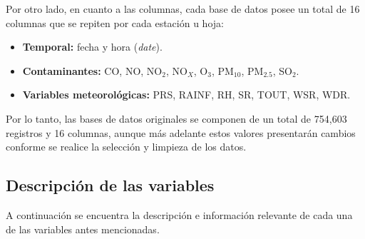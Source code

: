 \documentclass[11pt,letterpaper]{article}
\begin{document}
Por otro lado, en cuanto a las columnas, cada base de datos posee un total de 16 columnas que se repiten por cada estaci\'on u hoja:
\begin{itemize}\itemsep0pt
\item \textbf{Temporal:} fecha y hora (\textit{date}).
\item \textbf{Contaminantes:} CO, NO, NO$_2$, NO$_X$, O$_3$, PM$_{10}$, PM$_{2.5}$, SO$_2$.
\item \textbf{Variables meteorol\'ogicas:} PRS, RAINF, RH, SR, TOUT, WSR, WDR.
\end{itemize}
Por lo tanto, las bases de datos originales se componen de un total de 754,603 registros y 16 columnas, aunque m\'as adelante estos valores presentar\'an cambios conforme se realice la selecci\'on y limpieza de los datos.

\subsection{Descripci\'on de las variables}
A continuaci\'on se encuentra la descripci\'on e informaci\'on relevante de cada una de las variables antes mencionadas.
\end{document}
